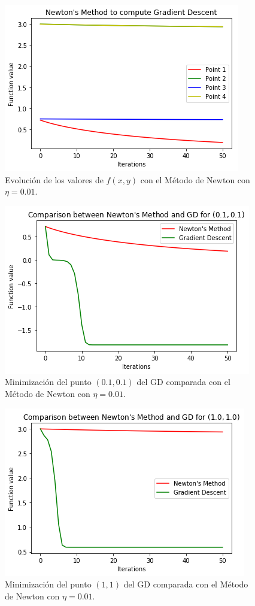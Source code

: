 \documentclass[11pt,a4paper]{article}
\begin{document}
\begin{figure}[H]
\centering
\includegraphics[scale=0.8]{img/nm_lr_cmp.png}
\caption{Evolución de los valores de $f(x, y)$ con el Método de Newton con $\eta  = 0.01$.}
\end{figure}

\begin{figure}[H]
\centering
\includegraphics[scale=0.8]{img/nm_lr_cmp1.png}
\caption{Minimización del punto $(0.1, 0.1)$ del GD comparada con el Método de Newton con $\eta = 0.01$.}
\end{figure}

\begin{figure}[H]
\centering
\includegraphics[scale=0.8]{img/nm_lr_cmp2.png}
\caption{Minimización del punto $(1, 1)$ del GD comparada con el Método de Newton con $\eta = 0.01$.}
\end{figure}
\end{document}
